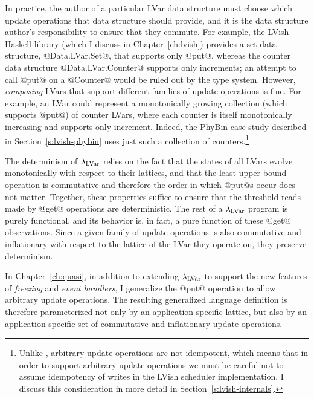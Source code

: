 In practice, the author of a particular LVar data structure must
choose which update operations that data structure should provide, and
it is the data structure author's responsibility to ensure that they
commute.  For example, the LVish Haskell library (which I discuss in
Chapter~\ref{ch:lvish}) provides a set data structure,
@Data.LVar.Set@, that supports only @put@, whereas the counter data
structure @Data.LVar.Counter@ supports only increments; an attempt to
call @put@ on a @Counter@ would be ruled out by the type system.
However, \emph{composing} LVars that support different families of
update operations is fine.  For example, an LVar could represent a
monotonically growing collection (which supports @put@) of counter
LVars, where each counter is itself monotonically increasing and
supports only increment.  Indeed, the PhyBin case study described in
Section~\ref{s:lvish-phybin} uses just such a collection of
counters.\footnote{Unlike , arbitrary update operations are
  not idempotent, which means that in order to support arbitrary
  update operations we must be careful not to assume idempotency of
  writes in the LVish scheduler implementation.  I discuss this
  consideration in more detail in Section~\ref{s:lvish-internals}.}

The determinism of $\lambda_{\textrm{LVar}}$ relies on the fact that the states of
all LVars evolve monotonically with respect to their lattices, and
that the least upper bound operation is commutative and therefore the
order in which @put@s occur does not matter.  Together, these
properties suffice to ensure that the threshold reads made by @get@
operations are deterministic. The rest of a $\lambda_{\textrm{LVar}}$ program is
purely functional, and its behavior is, in fact, a pure function of
these @get@ observations.  Since a given family of update operations
is also commutative and inflationary with respect to the lattice of
the LVar they operate on, they preserve determinism.

In Chapter~\ref{ch:quasi}, in addition to extending $\lambda_{\textrm{LVar}}$ to
support the new features of \emph{freezing} and \emph{event handlers},
I generalize the @put@ operation to allow arbitrary update operations.
The resulting generalized language definition is therefore
parameterized not only by an application-specific lattice, but also by
an application-specific set of commutative and inflationary update
operations.


